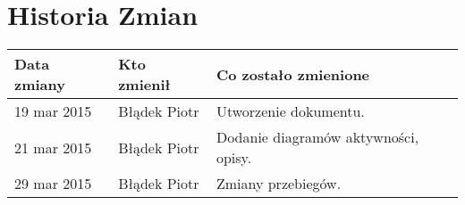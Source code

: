 \section{Historia Zmian}

\begin{tabularx}{\textwidth}{X|l|X}
\hline
\textbf{Data zmiany} & \textbf{Kto zmienił} & \textbf{Co zostało zmienione} \\ \hline
19 mar 2015          & Błądek Piotr         & Utworzenie dokumentu.          \\ \hline
21 mar 2015          & Błądek Piotr         & Dodanie diagramów aktywności, opisy.       \\ \hline
29 mar 2015          & Błądek Piotr         & Zmiany przebiegów.       \\ \hline
\end{tabularx}